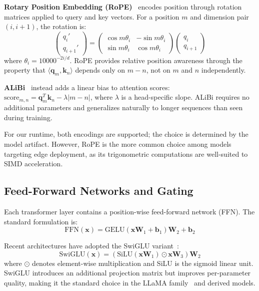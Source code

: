 \documentclass[12pt, letterpaper, twoside]{report}
\begin{document}
\textbf{Rotary Position Embedding (RoPE)}~\cite{su2024roformer} encodes position through rotation matrices applied to query and key vectors. For a position $m$ and dimension pair $(i, i+1)$, the rotation is:
\begin{equation}
\begin{pmatrix} q_i' \\ q_{i+1}' \end{pmatrix} = \begin{pmatrix} \cos m\theta_i & -\sin m\theta_i \\ \sin m\theta_i & \cos m\theta_i \end{pmatrix} \begin{pmatrix} q_i \\ q_{i+1} \end{pmatrix}
\end{equation}
where $\theta_i = 10000^{-2i/d}$. RoPE provides relative position awareness through the property that $\langle \mathbf{q}_m, \mathbf{k}_n \rangle$ depends only on $m - n$, not on $m$ and $n$ independently.

\textbf{ALiBi}~\cite{press2021alibi} instead adds a linear bias to attention scores: $\text{score}_{m,n} = \mathbf{q}_m^T\mathbf{k}_n - \lambda|m - n|$, where $\lambda$ is a head-specific slope. ALiBi requires no additional parameters and generalizes naturally to longer sequences than seen during training.

For our runtime, both encodings are supported; the choice is determined by the model artifact. However, RoPE is the more common choice among models targeting edge deployment, as its trigonometric computations are well-suited to SIMD acceleration.

\subsection{Feed-Forward Networks and Gating}
\label{subsec:ffn}

Each transformer layer contains a position-wise feed-forward network (FFN). The standard formulation is:
\begin{equation}
\text{FFN}(\mathbf{x}) = \text{GELU}(\mathbf{x}\mathbf{W}_1 + \mathbf{b}_1)\mathbf{W}_2 + \mathbf{b}_2
\end{equation}

Recent architectures have adopted the SwiGLU variant~\cite{shazeer2020glu}:
\begin{equation}
\text{SwiGLU}(\mathbf{x}) = (\text{SiLU}(\mathbf{x}\mathbf{W}_1) \odot \mathbf{x}\mathbf{W}_3)\mathbf{W}_2
\end{equation}
where $\odot$ denotes element-wise multiplication and SiLU is the sigmoid linear unit. SwiGLU introduces an additional projection matrix but improves per-parameter quality, making it the standard choice in the LLaMA family~\cite{touvron2023llama, touvron2023llama2} and derived models.
\end{document}
